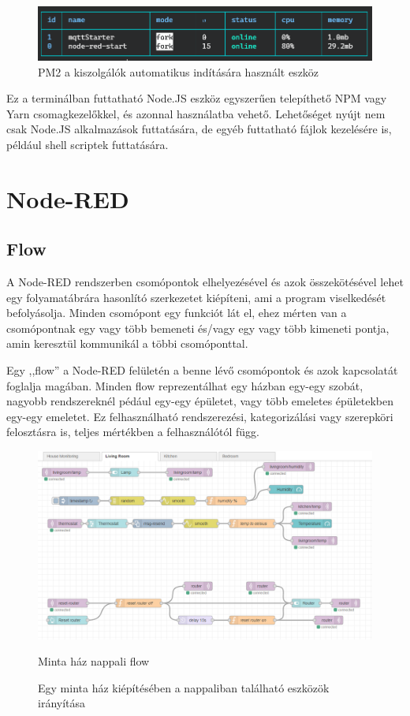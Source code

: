 \documentclass[
]{thesis-ekf}
\theoremstyle{definition}
\theoremstyle{remark}
\begin{document}
\begin{figure}[h]
	\includegraphics[width=1\textwidth]{images/pm2.png}
	\caption{PM2\cite{pm2} a kiszolgálók automatikus indítására használt eszköz}
\end{figure}

Ez a terminálban futtatható Node.JS eszköz egyszerűen telepíthető NPM vagy Yarn csomagkezelőkkel, és azonnal használatba vehető.
Lehetőséget nyújt nem csak Node.JS alkalmazások futtatására, de egyéb futtatható fájlok kezelésére is, például shell scriptek futtatására.

\section{Node-RED}
\subsection{Flow}
A Node-RED rendszerben csomópontok elhelyezésével és azok összekötésével lehet egy folyamatábrára hasonlító szerkezetet kiépíteni, 
ami a program viselkedését befolyásolja. Minden csomópont egy funkciót lát el, ehez mérten van a csomópontnak 
egy vagy több bemeneti és/vagy egy vagy több kimeneti pontja, amin keresztül kommunikál a többi csomóponttal.

Egy ,,flow'' a Node-RED felületén a benne lévő csomópontok és azok kapcsolatát foglalja magában. 
Minden flow reprezentálhat egy házban egy-egy szobát, nagyobb rendszereknél pédául egy-egy épületet, vagy több emeletes épületekben egy-egy emeletet.
Ez felhasználható rendszerezési, kategorizálási vagy szerepköri felosztásra is, teljes mértékben a felhasználótól függ.

\begin{figure}[h]
	\includegraphics[width=1\textwidth]{images/flow.png}
	\caption{Minta ház nappali flow}
	\caption{Egy minta ház kiépítésében a nappaliban található eszközök irányítása}
\end{figure}
\end{document}
